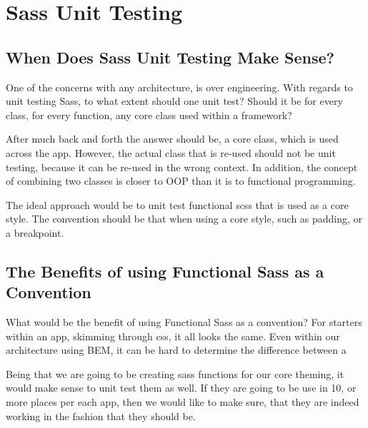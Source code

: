 \maketitle{}
\section{ Sass Unit Testing }

\subsection{ When Does Sass Unit Testing Make Sense? }
One of the concerns with any architecture, is over engineering. With regards to
unit testing Sass, to what extent should one unit test? Should it be for every
class, for every function, any core class used within a framework?

After much back and forth the answer should be, a core class, which is used
across the app. However, the actual class that is re-used should not be unit
testing, because it can be re-used in the wrong context. In addition, the
concept of combining two classes is closer to OOP than it is to functional
programming.

The ideal approach would be to unit test functional scss that is used as a
core style. The convention should be that when using a core style, such as
padding, or a breakpoint.

\subsection{ The Benefits of using Functional Sass as a Convention }
What would be the benefit of using Functional Sass as a convention? For starters
within an app, skimming through css, it all looks the same. Even within our
architecture using BEM, it can be hard to determine the difference between a

Being that we are going to be creating sass functions for our core theming, it
would make sense to unit test them as well. If they are going to be use in 10,
or more places per each app, then we would like to make sure, that they are
indeed working in the fashion that they should be.
